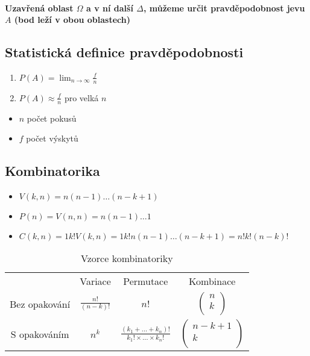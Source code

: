 \documentclass{article}
\begin{document}
\paragraph{Uzavřená oblast $\Omega$ a v ní další $\Delta$, můžeme určit pravděpodobnost jevu $A$ (bod leží v obou oblastech)}

\subsection{Statistická definice pravděpodobnosti}
\begin{enumerate}
    \item $P\left(A\right)=\lim_{n\to\infty} \frac{f}{n}$
    \item $P\left(A\right)\approx\frac{f}{n}$ pro velká $n$
\end{enumerate}

\begin{itemize}
    \item $n$ počet pokusů
    \item $f$ počet výskytů
\end{itemize}

\subsection{Kombinatorika}
\begin{itemize}
    \item $V\left(k,n\right)=n\left(n-1\right)\ldots\left(n-k+1\right)$
    \item $P\left(n\right) =V\left(n,n\right) =n\left(n-1\right)\ldots1$
    \item $C(k,n)=1k!V(k,n)=1k!n(n-1)\ldots(n-k+1)=n!k!(n-k)!$
\end{itemize}

\begin{table}[h]
    \centering
    \begin{tabular}{c|c|c|c}
         & Variace & Permutace & Kombinace \\
        Bez opakování & $\frac{n!}{(n-k)!}$ & $n!$ &
        $\begin{pmatrix}
            n \\
            k \\
        \end{pmatrix}$\\
        S opakováním & $n^k$ & $\frac{(k_1+\ldots+k_n)!}{k_1!\times\ldots\times k_n!}$ & $\begin{pmatrix}
            n-k+1 \\
            k \\
        \end{pmatrix}$ \\
    \end{tabular}
    \caption{Vzorce kombinatoriky}
    \label{tab:komb}
\end{table}
\end{document}
